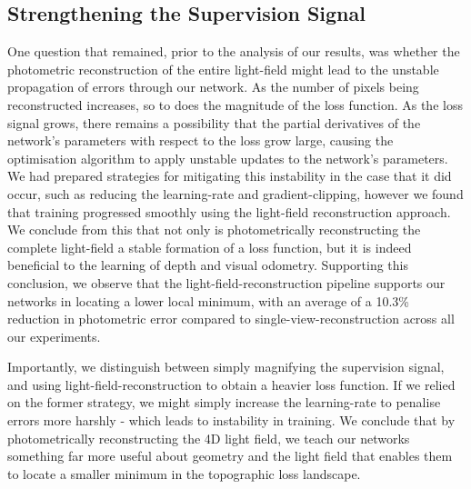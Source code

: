 \subsection{Strengthening the Supervision Signal}
One question that remained, prior to the analysis of our results, was whether the photometric reconstruction of the entire light-field might lead to the unstable propagation of errors through our network. As the number of pixels being reconstructed increases, so to does the magnitude of the loss function. As the loss signal grows, there remains a possibility that the partial derivatives of the network's parameters with respect to the loss grow large, causing the optimisation algorithm to apply unstable updates to the network's parameters. We had prepared strategies for mitigating this instability in the case that it did occur, such as reducing the learning-rate and gradient-clipping, however we found that training progressed smoothly using the light-field reconstruction approach. We conclude from this that not only is photometrically reconstructing the complete light-field a stable formation of a loss function, but it is indeed beneficial to the learning of depth and visual odometry. Supporting this conclusion, we observe that the light-field-reconstruction pipeline supports our networks in locating a lower local minimum, with an average of a 10.3\% reduction in photometric error compared to single-view-reconstruction across all our experiments. 

Importantly, we distinguish between simply magnifying the supervision signal, and using light-field-reconstruction to obtain a heavier loss function. If we relied on the former strategy, we might simply increase the learning-rate to penalise errors more harshly - which leads to instability in training. We conclude that by photometrically reconstructing the 4D light field, we teach our networks something far more useful about geometry and the light field that enables them to locate a smaller minimum in the topographic loss landscape.

